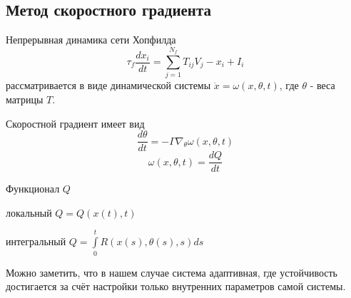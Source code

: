 \subsection{Метод скоростного градиента}
Непрерывная динамика сети Хопфилда
\[
  \tau_f \frac{dx_i}{dt} =
  \sum\limits_{j=1}^{N_f} T_{ij} V_j - x_i + I_i
\]
рассматривается в виде динамической системы
\(\dot{x} = \omega(x,\theta,t)\), где \(\theta\) - веса матрицы
\(T\).

Скоростной градиент имеет вид
\[
  \frac{d\theta}{dt} = -\Gamma \nabla_{\theta}{\omega(x,\theta,t)}
\]
\[
  \omega(x,\theta,t) = \frac{dQ}{dt}
\]

Функционал \(Q\)

локальный \(Q = Q(x(t), t)\)

интегральный \(Q = \int\limits_0^t R(x(s),\theta(s),s) ds\) \cite{fradkov1990adaptive}

Можно заметить, что в нашем случае система адаптивная,
где устойчивость достигается за счёт настройки только
внутренних параметров самой системы.

